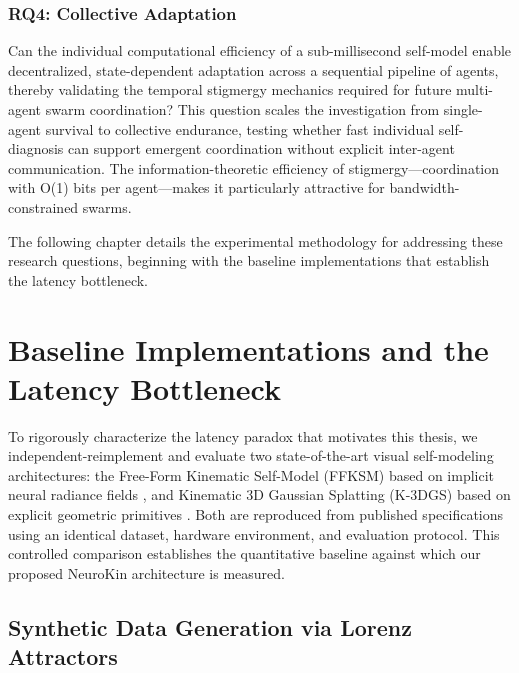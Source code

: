 \documentclass[12pt,a4paper,oneside]{report}
\begin{document}
\subsection{RQ4: Collective Adaptation}
Can the individual computational efficiency of a sub-millisecond self-model enable decentralized, state-dependent adaptation across a sequential pipeline of agents, thereby validating the temporal stigmergy mechanics required for future multi-agent swarm coordination? This question scales the investigation from single-agent survival to collective endurance, testing whether fast individual self-diagnosis can support emergent coordination without explicit inter-agent communication. The information-theoretic efficiency of stigmergy---coordination with O(1) bits per agent---makes it particularly attractive for bandwidth-constrained swarms.

The following chapter details the experimental methodology for addressing these research questions, beginning with the baseline implementations that establish the latency bottleneck.
\clearpage

\chapter{Baseline Implementations and the Latency Bottleneck}
\label{chap:baseline_latency_bottleneck}

To rigorously characterize the latency paradox that motivates this thesis, we independent-reimplement and evaluate two state-of-the-art visual self-modeling architectures: the Free-Form Kinematic Self-Model (FFKSM) based on implicit neural radiance fields \cite{hu2024teaching}, and Kinematic 3D Gaussian Splatting (K-3DGS) based on explicit geometric primitives \cite{hu2025learning}. Both are reproduced from published specifications using an identical dataset, hardware environment, and evaluation protocol. This controlled comparison establishes the quantitative baseline against which our proposed NeuroKin architecture is measured.

\section{Synthetic Data Generation via Lorenz Attractors}
\label{sec:synthetic_data_generation}
\end{document}
